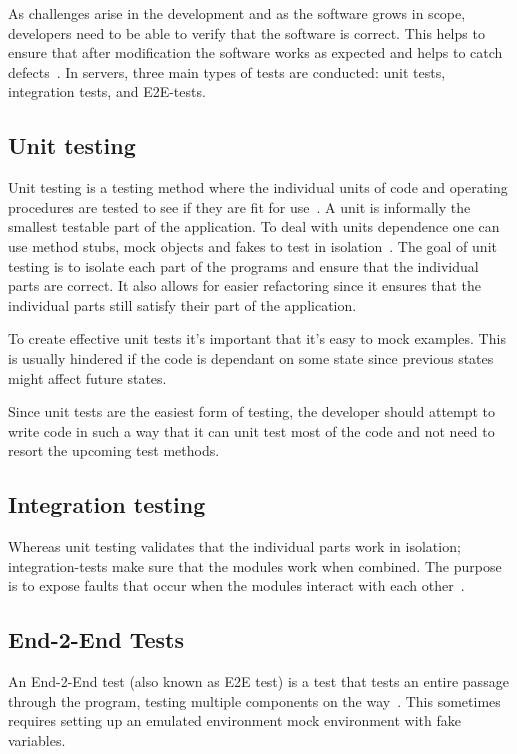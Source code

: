 As challenges arise in the development and as the software grows in scope,
developers need to be able to verify that the software is correct. This helps to
ensure that after modification the software works as expected and helps to catch
defects~\cite{williams2009effectiveness}. In servers, three main types of tests
are conducted: unit tests, integration tests, and E2E-tests.

\subsection{Unit testing}

Unit testing is a testing method where the individual units of code and
operating procedures are tested to see if they are fit for
use~\cite{beck2003test}. A unit is informally the smallest testable part of the
application.  To deal with units dependence one can use method stubs, mock
objects and fakes to test in isolation~\cite{coelho2006unit}. The goal of unit
testing is to isolate each part of the programs and ensure that the individual
parts are correct. It also allows for easier refactoring since it ensures that
the individual parts still satisfy their part of the application.

To create effective unit tests it's important that it's easy to mock examples.
This is usually hindered if the code is dependant on some state since previous
states might affect future states.

Since unit tests are the easiest form of testing, the developer should attempt
to write code in such a way that it can unit test most of the code and not need
to resort the upcoming test methods.

\subsection{Integration testing}

Whereas unit testing validates that the individual parts work in isolation;
integration-tests make sure that the modules work when combined. The purpose is
to expose faults that occur when the modules interact with each
other~\cite{istqb2015glossary}.

\subsection{End-2-End Tests}

An End-2-End test (also known as E2E test) is a test that tests an entire
passage through the program, testing multiple components on the
way~\cite{tsai2001end}. This sometimes requires setting up an emulated
environment mock environment with fake variables.

